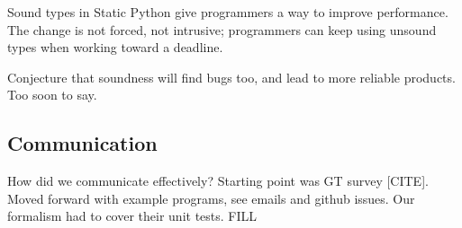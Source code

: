 \documentclass[a4paper,english,cleveref,autoref,thm-restate,anonymous,]{lipics-v2021}
\begin{document}
Sound types in Static Python give programmers a way to improve performance.
The change is not forced, not intrusive;
programmers can keep using unsound types when working toward a deadline.

Conjecture that soundness will find bugs too, and lead to more reliable products.
Too soon to say.


\subsection{Communication}

How did we communicate effectively?
Starting point was GT survey [CITE].
Moved forward with example programs, see emails and github issues.
Our formalism had to cover their unit tests.
FILL




\end{document}
